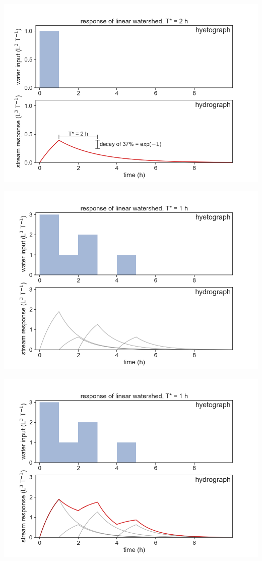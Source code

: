 \documentclass[
  letterpaper,
  DIV=11,
  numbers=noendperiod]{scrreprt}
\begin{document}
\includegraphics{archive/figures/hyetograph_hydrograph2.png}

\includegraphics{archive/figures/hyetograph_hydrograph3.png}

\includegraphics{archive/figures/hyetograph_hydrograph3b.png}
\end{document}
